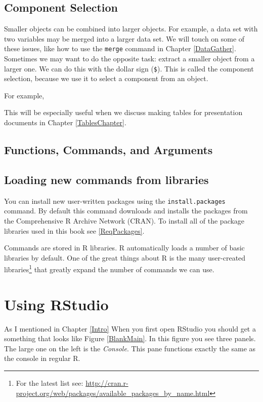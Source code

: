 \documentclass[ChapterTOCs,krantz1]{krantz}\usepackage{graphicx, color}
\begin{document}
\subsection{Component Selection}

Smaller objects can be combined into larger objects. For example, a data set with two variables may be merged into a larger data set. We will touch on some of these issues, like how to use the {\tt{merge}} command in Chapter \ref{DataGather}. Sometimes we may want to do the opposite task: extract a smaller object from a larger one. We can do this with the dollar sign ({\tt{\$}}). This is called the component selection, because we use it to select a component from an object.

For example, 

This will be especially useful when we discuss making tables for presentation documents in Chapter \ref{TablesChapter}.

\subsection{Functions, Commands, and Arguments}

\subsection{Loading new commands from libraries}

You can install new user-written packages using the {\tt{install.packages}} command. By default this command downloads and installs the packages from the Comprehensive R Archive Network (CRAN). To install all of the package libraries used in this book see \ref{ReqPackages}.

Commands are stored in R libraries. R automatically loads a number of basic libraries by default. One of the great things about R is the many user-created libraries\footnote{For the latest list see: \url{http://cran.r-project.org/web/packages/available_packages_by_name.html}} that greatly expand the number of commands we can use. 

\section{Using RStudio}

As I mentioned in Chapter \ref{Intro} When you first open RStudio you should get a something that looks like Figure \ref{BlankMain}. In this figure you see three panels. The large one on the left is the {\emph{Console}}. This pane functions exactly the same as the console in regular R. 
\end{document}
